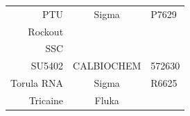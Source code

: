 \documentclass[11pt,singlespacinge,twoside]{reedthesis} %
\begin{document}
\begin{longtable}[]{@{}rcl@{}}
\begin{minipage}[t]{0.26\columnwidth}
PTU\strut
\end{minipage} & \begin{minipage}[t]{0.50\columnwidth}\centering
Sigma\strut
\end{minipage} & \begin{minipage}[t]{0.16\columnwidth}\raggedright
P7629\strut
\end{minipage}\tabularnewline
\begin{minipage}[t]{0.26\columnwidth}\raggedleft
Rockout\strut
\end{minipage} & \begin{minipage}[t]{0.50\columnwidth}\centering
\strut
\end{minipage} & \begin{minipage}[t]{0.16\columnwidth}\raggedright
\strut
\end{minipage}\tabularnewline
\begin{minipage}[t]{0.26\columnwidth}\raggedleft
SSC\strut
\end{minipage} & \begin{minipage}[t]{0.50\columnwidth}\centering
\strut
\end{minipage} & \begin{minipage}[t]{0.16\columnwidth}\raggedright
\strut
\end{minipage}\tabularnewline
\begin{minipage}[t]{0.26\columnwidth}\raggedleft
SU5402\strut
\end{minipage} & \begin{minipage}[t]{0.50\columnwidth}\centering
CALBIOCHEM\strut
\end{minipage} & \begin{minipage}[t]{0.16\columnwidth}\raggedright
572630\strut
\end{minipage}\tabularnewline
\begin{minipage}[t]{0.26\columnwidth}\raggedleft
Torula RNA\strut
\end{minipage} & \begin{minipage}[t]{0.50\columnwidth}\centering
Sigma\strut
\end{minipage} & \begin{minipage}[t]{0.16\columnwidth}\raggedright
R6625\strut
\end{minipage}\tabularnewline
\begin{minipage}[t]{0.26\columnwidth}\raggedleft
Tricaine\strut
\end{minipage} & \begin{minipage}[t]{0.50\columnwidth}\centering
Fluka\strut
\end{minipage} & \begin{minipage}[t]{0.16\columnwidth}\raggedright

\end{minipage}
\end{longtable}
\end{document}
